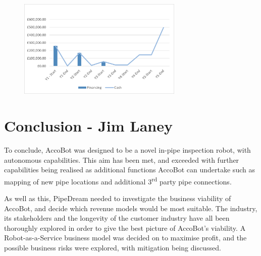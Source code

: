 \documentclass[11pt]{article}		%
\newcommand{\supercite}[1]{\textsuperscript{\cite{#1}}}		%
\begin{document}
               \begin{figure}[H]
    					\centering
        					\includegraphics[width=0.7\textwidth]{CashFlow}
        					\label{liquidity}
			    \end{figure}
			    
    \section[Conclusion]{Conclusion - Jim Laney}
        
        To conclude, AccoBot was designed to be a novel in-pipe inspection robot, with autonomous capabilities.
        This aim has been met, and exceeded with further capabilities being realised as additional functions AccoBot can undertake such as mapping of new pipe locations and additional 3\textsuperscript{rd} party pipe connections.
        
        As well as this, PipeDream needed to investigate the business viability of AccoBot, and decide which revenue models would be most suitable.
        The industry, its stakeholders and the longevity of the customer industry have all been thoroughly explored in order to give the best picture of AccoBot's viability.
        A Robot-as-a-Service business model was decided on to maximise profit, and the possible business risks were explored, with mitigation being discussed.

	\pagebreak		%
	
	
	
	
		\begingroup\onehalfspacing
			{\small
				
				
			}
		\endgroup
	
\end{document}
